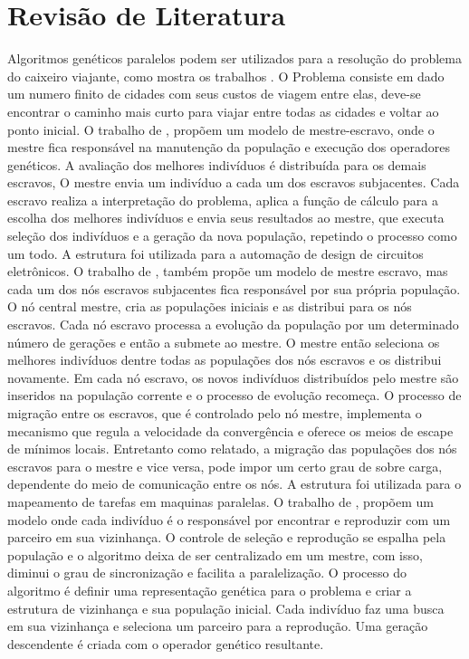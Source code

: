 \chapter[Revisão de Literatura]{Revisão de Literatura}
Algoritmos genéticos paralelos podem ser utilizados para a resolução do problema do caixeiro viajante, como mostra os trabalhos \cite{Jason}\cite{Alaoui}\cite{Heinz}. O Problema consiste em dado um numero finito de cidades com seus custos de viagem entre elas, deve-se encontrar o caminho mais curto para viajar entre todas as cidades e voltar ao ponto inicial. 
O trabalho de \cite{Jason}, propõem um modelo de mestre-escravo, onde o mestre fica responsável na manutenção da população e execução dos operadores genéticos. A avaliação dos melhores indivíduos é distribuída para os demais escravos, O mestre envia um indivíduo a cada um dos escravos subjacentes. Cada escravo realiza a interpretação do problema, aplica a função de cálculo para a escolha dos melhores indivíduos e envia seus resultados ao mestre, que executa seleção dos indivíduos e a geração da nova população, repetindo o processo como um todo. A estrutura foi utilizada para a automação de design de circuitos eletrônicos.
O trabalho de \cite{Alaoui}, também propõe um modelo de mestre escravo, mas cada um dos nós escravos subjacentes fica responsável por sua própria população. O nó central mestre, cria as populações iniciais e as distribui para os nós escravos. Cada nó escravo processa a evolução da população por um determinado número de gerações e então a submete ao mestre. O mestre então seleciona os melhores indivíduos dentre todas as populações dos nós escravos e os distribui novamente. Em cada nó escravo, os novos indivíduos distribuídos pelo mestre são inseridos na população corrente e o processo de evolução recomeça. O processo de migração entre os escravos, que é controlado pelo nó mestre, implementa o mecanismo que regula a velocidade da convergência e oferece os meios de escape de mínimos locais. Entretanto como relatado, a migração das populações dos nós escravos para o mestre e vice versa, pode impor um certo grau de sobre carga, dependente do meio de comunicação entre os nós. A estrutura foi utilizada para o mapeamento de tarefas em maquinas paralelas.
O trabalho de \cite{Heinz}, propõem um modelo onde cada indivíduo é o responsável por encontrar e reproduzir com um parceiro em sua vizinhança. O controle de seleção e reprodução se espalha pela população e o algoritmo deixa de ser centralizado em um mestre, com isso, diminui o grau de sincronização e facilita a paralelização. O processo do algoritmo é definir uma representação genética para o problema e criar a estrutura de vizinhança e sua população inicial. Cada indivíduo faz uma busca em sua vizinhança e seleciona um parceiro para a reprodução. Uma geração descendente é criada com o operador genético resultante.
